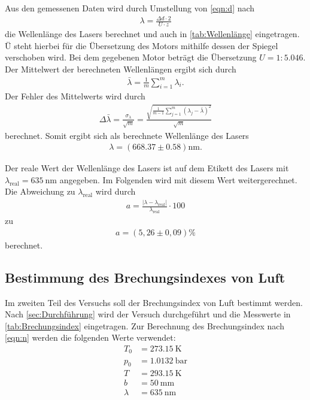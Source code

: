 Aus den gemessenen Daten wird durch Umstellung von \autoref{eqn:d} nach
\begin{align*}
  \lambda = \frac{\Delta d \cdot 2}{ U \cdot z}
\end{align*}
die Wellenlänge des Lasers berechnet und auch in \autoref{tab:Wellenlänge} eingetragen.
$Ü$ steht hierbei für die Übersetzung des Motors mithilfe dessen der Spiegel verschoben wird.
Bei dem gegebenen Motor beträgt die Übersetzung $U= 1:5.046$. 
Der Mittelwert der berechneten Wellenlängen ergibt sich durch
\begin{align}
  \bar{\lambda}=\frac{1}{m} \sum_{i=1}^m \lambda_i.
  \label{eqn:Mittelwert}
\end{align}
Der Fehler des Mittelwerts wird durch 
\begin{align}
  \Delta \bar{\lambda}= \frac{\sigma_\lambda}{\sqrt{m}} = \frac{\sqrt{\frac{1}{m-1}\sum_{j=1}^m (\lambda_j-\bar{\lambda})^2}}{\sqrt{m}}
  \label{eqn:Fehler}
\end{align}
berechnet.
Somit ergibt sich als berechnete Wellenlänge des Lasers
\begin{align*}
  \lambda= (668.37 \pm 0.58 )\si{\nano\meter}.
\end{align*}

Der reale Wert der Wellenlänge des Lasers ist auf dem Etikett des Lasers mit $\lambda_{\text{real}}=\qty{635}{\nano\meter}$ angegeben.
Im Folgenden wird mit diesem Wert weitergerechnet.
Die Abweichung zu $\lambda_{\text{real}}$ wird durch
\begin{align}
  a=\frac{|\lambda-\lambda_{\text{real}}|}{\lambda_{\text{real}}}\cdot 100 \label{eqn:abweich}
\end{align}
zu
\begin{align*}
  a=(5,26 \pm 0,09) \si{\percent}
\end{align*}
berechnet.

\subsection{Bestimmung des Brechungsindexes von Luft}
\label{sub:Brechungsindex}

Im zweiten Teil des Versuchs soll der Brechungsindex von Luft bestimmt werden.
Nach \autoref{sec:Durchführung} wird der Versuch durchgeführt und die Messwerte in \autoref{tab:Brechungsindex} eingetragen.
Zur Berechnung des Brechungsindex nach \autoref{eqn:n}
werden die folgenden Werte verwendet\cite{V401}:
\begin{align*}
  T_0 &= \qty{273.15}{\kelvin}\\
  p_0 &= \qty{1.0132}{\bar}\\
  T &= \qty{293.15}{\kelvin}\\
  b &=\qty{50}{\milli\meter}\\
  \lambda &=\qty{635}{\nano\meter}
\end{align*}

